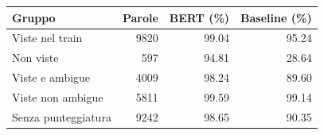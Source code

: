 \begin{tabular}{lrrr}
\toprule
Gruppo & Parole & BERT (\%) & Baseline (\%) \\
\midrule
Viste nel train & 9820 & 99.04 & 95.24 \\
Non viste & 597 & 94.81 & 28.64 \\
Viste e ambigue & 4009 & 98.24 & 89.60 \\
Viste non ambigue & 5811 & 99.59 & 99.14 \\
Senza punteggiatura & 9242 & 98.65 & 90.35 \\
\bottomrule
\end{tabular}
